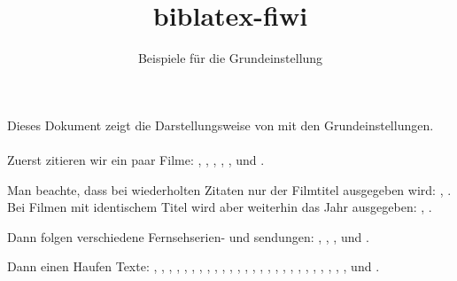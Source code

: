 \documentclass[a4paper]{scrartcl}
\begin{document}
\title{biblatex-fiwi}\subtitle{Beispiele für die Grundeinstellung}\date{}\maketitle
\noindent Dieses Dokument zeigt die Darstellungsweise von  mit den Grundeinstellungen.\\ \\

\noindent Zuerst zitieren wir ein paar Filme: , , , , ,  und .

Man beachte, dass bei wiederholten Zitaten nur der Filmtitel ausgegeben wird: , . Bei Filmen mit identischem Titel wird aber weiterhin das Jahr ausgegeben: , .

Dann folgen verschiedene Fernsehserien- und sendungen: , , ,  und .

Dann einen Haufen Texte: \textcite{sklovskij.v:1969a} \textcite{Spiegel.S:2010c}, \textcite{Muller.A:2010a}, \textcite{Wells.H:1908}, \textcite{Spiegel.S:2007b}, \textcite{Lukian.1981}, \textcite{Kepler.J:1993}, \textcite{Coleridge:1983a}, \textcite{vonMatt.P:2002}, \textcite{Keitz.U:2004a}, \textcite{Wells.HG:1980}, \textcite{Ackerman.Strickland:1981}, \textcite{Anderson.P:1971a}, \textcite{Gaudreault.A:1993}, \textcite{Poe.E:1982c}, \textcite{Poe.E:1999a}, \textcite{Parrinder.P:1980}, \textcite{Wells.H:1980*2}, \textcite{James.H:2004a}, \textcite{James.H:2007a}, \textcite{Hedeler.W:2005a}, \textcite{Ballhausen.T:2009a}, \textcite{Zymner.R:2003a}, \textcite{Zymner.R:2011a}, \textcite{Nelmes.J:2011b}, \textcite{Kuhn.A:1990*2,Blish.J:1973a,Dureau.Y:2005a}, \textcite{Todorov.T:1992}, \textcite{Bordwell.D:2004a} und \textcite{Kirchner.A:2008a}.


\printbibliography[nottype=movie]
\newrefcontext[sorting=title]
\printbibliography[type=movie,heading=film]
\end{document}
